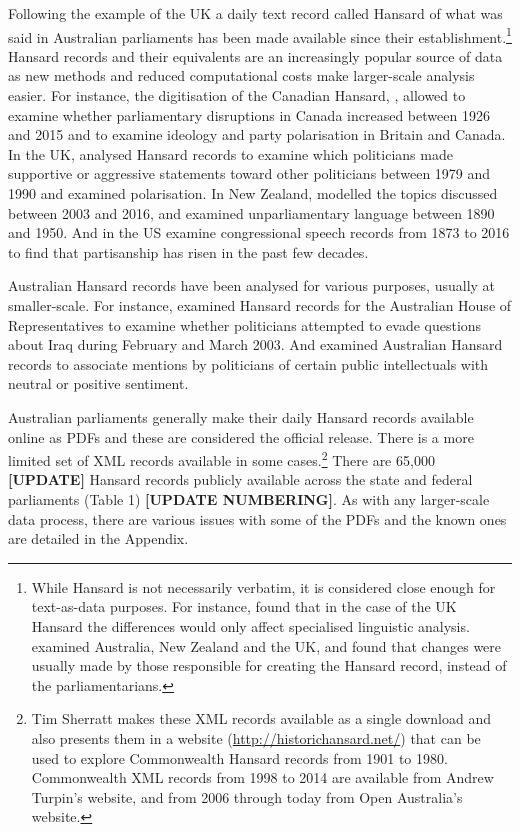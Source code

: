 \documentclass[12pt,]{article}
\theoremstyle{definition}
\theoremstyle{definition}
\theoremstyle{definition}
\theoremstyle{remark}
\begin{document}
Following the example of the UK a daily text record called Hansard of
what was said in Australian parliaments has been made available since
their establishment.\footnote{While Hansard is not necessarily verbatim,
  it is considered close enough for text-as-data purposes. For instance,
  \citet{Mollin2008} found that in the case of the UK Hansard the
  differences would only affect specialised linguistic analysis.
  \citet{Edwards2016} examined Australia, New Zealand and the UK, and
  found that changes were usually made by those responsible for creating
  the Hansard record, instead of the parliamentarians.} Hansard records
and their equivalents are an increasingly popular source of data as new
methods and reduced computational costs make larger-scale analysis
easier. For instance, the digitisation of the Canadian Hansard,
\citet{BeelenEtc2017}, allowed \citet{Whyte2017} to examine whether
parliamentary disruptions in Canada increased between 1926 and 2015 and
\citet{RheaultCochran2018} to examine ideology and party polarisation in
Britain and Canada. In the UK, \citet{Duthie2016} analysed Hansard
records to examine which politicians made supportive or aggressive
statements toward other politicians between 1979 and 1990 and
\citet{PetersonSpirling2018} examined polarisation. In New Zealand,
\citet{Curran2017} modelled the topics discussed between 2003 and 2016,
and \citet{Graham2016} examined unparliamentary language between 1890
and 1950. And in the US \citet{GentzkowShapiroTaddy2018} examine
congressional speech records from 1873 to 2016 to find that partisanship
has risen in the past few decades.

Australian Hansard records have been analysed for various purposes,
usually at smaller-scale. For instance, \citet{Rasiah2010} examined
Hansard records for the Australian House of Representatives to examine
whether politicians attempted to evade questions about Iraq during
February and March 2003. And \citet{GansLeigh2012} examined Australian
Hansard records to associate mentions by politicians of certain public
intellectuals with neutral or positive sentiment.

Australian parliaments generally make their daily Hansard records
available online as PDFs and these are considered the official release.
There is a more limited set of XML records available in some
cases.\footnote{Tim Sherratt makes these XML records available as a
  single download and also presents them in a website
  (\url{http://historichansard.net/}) that can be used to explore
  Commonwealth Hansard records from 1901 to 1980. Commonwealth XML
  records from 1998 to 2014 are available from Andrew Turpin's website,
  and from 2006 through today from Open Australia's website.} There are
65,000 \textbf{{[}UPDATE{]}} Hansard records publicly available across
the state and federal parliaments (Table 1) \textbf{{[}UPDATE
NUMBERING{]}}. As with any larger-scale data process, there are various
issues with some of the PDFs and the known ones are detailed in the
Appendix.
\end{document}
